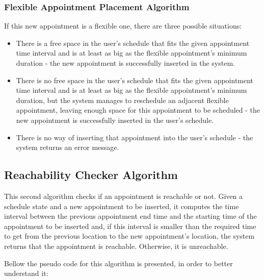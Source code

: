 \documentclass[12pt]{article}
\begin{document}
\subsubsection{Flexible Appointment Placement Algorithm}

If this new appointment is a flexible one, there are three possible situations:
\begin{itemize}
    \item There is a free space in the user's schedule that fits the given appointment time interval and is at least as big as the flexible appointment's minimum duration - the new appointment is successfully inserted in the system.
    \item There is no free space in the user's schedule that fits the given appointment time interval and is at least as big as the flexible appointment's minimum duration, but the system manages to reschedule an adjacent flexible appointment, leaving enough space for this appointment to be scheduled - the new appointment is successfully inserted in the user's schedule.
    \item There is no way of inserting that appointment into the user's schedule - the system returns an error message.
\end{itemize}


\subsection{Reachability Checker Algorithm}
This second algorithm checks if an appointment is reachable or not. Given a schedule state and a new appointment to be inserted, it computes the time interval between the previous appointment end time and the starting time of the appointment to be inserted and, if this interval is smaller than the required time to get from the previous location to the new appointment's location, the system returns that the appointment is reachable. Otherwise, it is unreachable.

Bellow the pseudo code for this algorithm is presented, in order to better understand it:

\begin{algorithm}[H]
\SetAlgoLined
{}
\end{algorithm}
\end{document}
